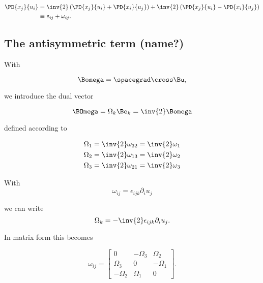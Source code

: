 \begin{equation}\label{eqn:continuumL9:50}
\begin{aligned}
\PD{x_j}{u_i}
&= 
\inv{2} \left( 
\PD{x_j}{u_i}
+\PD{x_i}{u_j}
\right)
+
\inv{2} \left( 
\PD{x_j}{u_i}
-\PD{x_i}{u_j}
\right) \\
&\equiv e_{ij} + \omega_{ij}.
\end{aligned}
\end{equation}

\subsection{The antisymmetric term (name?)}

With

\begin{equation}\label{eqn:continuumL9:70}
\Bomega = \spacegrad \cross \Bu,
\end{equation}

we introduce the dual vector 

\begin{equation}\label{eqn:continuumL9:90}
\BOmega = \Omega_k \Be_k = \inv{2} \Bomega
\end{equation}

defined according to

\begin{align}\label{eqn:continuumL9:110}
\Omega_1 &= \inv{2} \omega_{32} = \inv{2} \omega_1 \\
\Omega_2 &= \inv{2} \omega_{13} = \inv{2} \omega_2 \\
\Omega_3 &= \inv{2} \omega_{21} = \inv{2} \omega_3 
\end{align}

With 
\begin{equation}\label{eqn:continuumL9:n}
\omega_{ij}
= \epsilon_{ijk} \partial_i u_j
\end{equation}

we can write
\begin{equation}\label{eqn:continuumL9:590}
\Omega_k = -\inv{2} \epsilon_{ijk} \partial_i u_j.
\end{equation}

In matrix form this becomes

\begin{equation}\label{eqn:continuumL9:130}
\omega_{ij} = 
\begin{bmatrix}
0 & -\Omega_3 & \Omega_2 \\
\Omega_3 & 0 & -\Omega_1  \\
-\Omega_2 & \Omega_1 & 0
\end{bmatrix}.
\end{equation}

